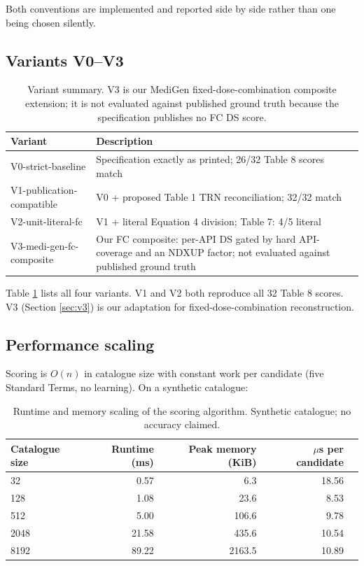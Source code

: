 \documentclass[12pt]{article}
\begin{document}
Both conventions are implemented and reported side by side rather than one being chosen silently.

\subsection{Variants V0--V3}
\label{sec:results-variants}

\begin{table}[htbp]
\centering\small
\caption{Variant summary. V3 is our MediGen fixed-dose-combination composite extension; it is not evaluated against published ground truth because the specification publishes no FC DS score.}
\label{tab:variants}
\begin{tabular}{@{}lp{6.2cm}@{}}
\toprule
Variant & Description \\
\midrule
V0-strict-baseline & Specification exactly as printed; 26/32 Table 8 scores match \\
V1-publication-compatible & V0 + proposed Table 1 TRN reconciliation; 32/32 match \\
V2-unit-literal-fc & V1 + literal Equation 4 division; Table 7: 4/5 literal \\
V3-medi-gen-fc-composite & Our FC composite: per-API DS gated by hard API-coverage and an NDXUP factor; not evaluated against published ground truth \\
\bottomrule
\end{tabular}
\end{table}

Table \ref{tab:variants} lists all four variants. V1 and V2 both reproduce all 32 Table 8 scores. V3 (Section \ref{sec:v3}) is our adaptation for fixed-dose-combination reconstruction.

\subsection{Performance scaling}
\label{sec:results-scaling}

Scoring is $O(n)$ in catalogue size with constant work per candidate (five Standard Terms, no learning). On a synthetic catalogue:

\begin{table}[htbp]
\centering\small
\caption{Runtime and memory scaling of the scoring algorithm. Synthetic catalogue; no accuracy claimed.}
\label{tab:scaling}
\begin{tabular}{@{}lrrrr@{}}
\toprule
Catalogue size & Runtime (ms) & Peak memory (KiB) & $\mu$s per candidate \\
\midrule
32 & 0.57 & 6.3 & 18.56 \\
128 & 1.08 & 23.6 & 8.53 \\
512 & 5.00 & 106.6 & 9.78 \\
2048 & 21.58 & 435.6 & 10.54 \\
8192 & 89.22 & 2163.5 & 10.89 \\
\bottomrule
\end{tabular}
\end{table}
\end{document}
